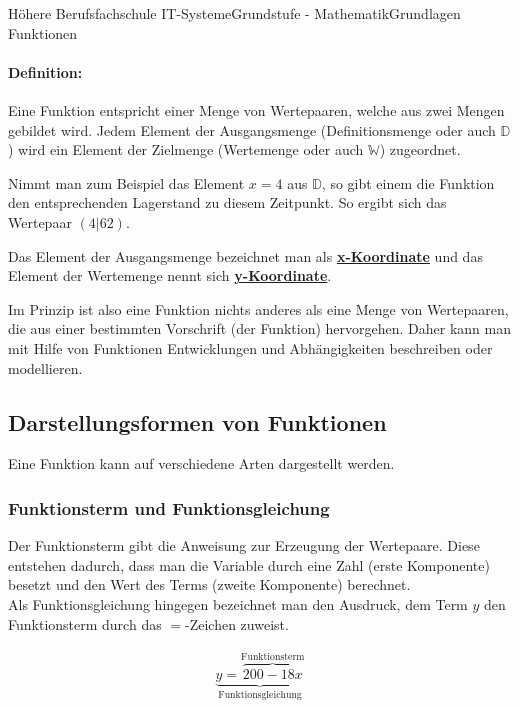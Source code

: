 \documentclass[11pt,twocolumn,oneside,openany,headings=optiontotoc,11pt,numbers=noenddot]{article}
\begin{document}
\begin{worksheet}{Höhere Berufsfachschule IT-Systeme}{Grundstufe - Mathematik}{Grundlagen Funktionen}
\begin{framed}
			\paragraph{Definition:} Eine Funktion entspricht einer Menge von Wertepaaren, welche aus zwei Mengen gebildet wird. Jedem Element der Ausgangsmenge (Definitionsmenge oder auch \(\mathbb{D}\)) wird ein Element der Zielmenge (Wertemenge oder auch \(\mathbb{W}\)) zugeordnet.
		\end{framed}
		\noindent
		Nimmt man zum Beispiel das Element \(x=4\) aus \(\mathbb{D}\), so gibt einem die Funktion den entsprechenden Lagerstand zu diesem Zeitpunkt. So ergibt sich das Wertepaar \((4|62)\).\\
		\par\bigskip\noindent
		Das Element der Ausgangsmenge bezeichnet man als \underline{\textbf{x-Koordinate}} und das Element der Wertemenge nennt sich \underline{\textbf{y-Koordinate}}.\\
		\par\bigskip\noindent
		Im Prinzip ist also eine Funktion nichts anderes als eine Menge von Wertepaaren, die aus einer bestimmten Vorschrift (der Funktion) hervorgehen. Daher kann man mit Hilfe von Funktionen Entwicklungen und Abhängigkeiten beschreiben oder modellieren.
		\subsection{Darstellungsformen von Funktionen}
		Eine Funktion kann auf verschiedene Arten dargestellt werden.
		\subsubsection*{Funktionsterm und Funktionsgleichung}
		Der Funktionsterm gibt die Anweisung zur Erzeugung der Wertepaare. Diese entstehen dadurch, dass man die Variable durch eine Zahl (erste Komponente) besetzt und den Wert des Terms (zweite Komponente) berechnet.\\
		Als Funktionsgleichung hingegen bezeichnet man den Ausdruck, dem Term \(y\) den Funktionsterm durch das \glqq{}\(=\)\grqq{}-Zeichen zuweist.\\
		\par\bigskip\noindent
		\begin{align*}
			\underbrace{y = \overbrace{200 -18x}^{\text{Funktionsterm}}}_{\text{Funktionsgleichung}}
		\end{align*}

\end{worksheet}
\end{document}

